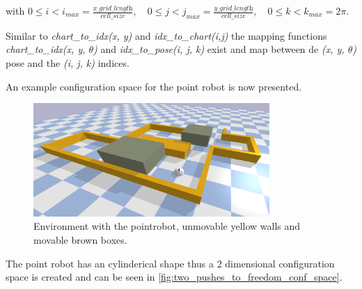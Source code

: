 with $0 \leq i < i_{max} = \frac{\textit{x\_grid\_length}}{\textit{cell\_size}}, \quad 0 \leq j < j_{max} = \frac{\textit{y\_grid\_length}}{\textit{cell\_size}}, \quad 0 \leq k < k_{max} = 2\pi$.\bs

Similar to \textit{chart\_to\_idx(x, y)} and \textit{idx\_to\_chart(i,j)} the mapping functions \textit{chart\_to\_idx(x, y, $\theta$)} and \textit{idx\_to\_pose(i, j, k)} exist and map between de \textit{(x, y, $\theta$)} pose and the \textit{(i, j, k)} indices.\bs

An example configuration space for the point robot is now presented.
\begin{figure}[H]
    \centering
    \includegraphics[width=0.8\textwidth]{figures/planning/two_push_to_freedom_env}
    \caption{Environment with the pointrobot, unmovable yellow walls and movable brown boxes.}%
    \label{fig:two_pushes_to_freedom_env}
\end{figure}

The point robot has an cylinderical shape thus a 2 dimensional configuration space is created and can be seen in \cref{fig:two_pushes_to_freedom_conf_space}.

